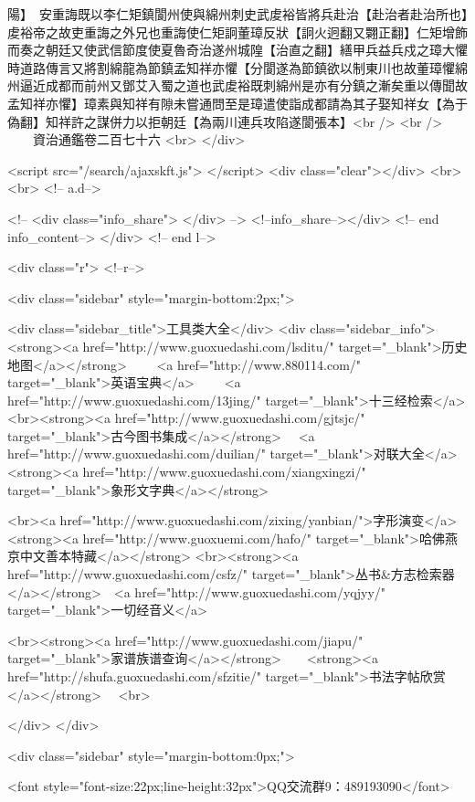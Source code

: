陽】　安重誨既以李仁矩鎮閬州使與綿州刺史武䖍裕皆將兵赴治【赴治者赴治所也】䖍裕帝之故吏重誨之外兄也重誨使仁矩詗董璋反狀【詗火迥翻又翾正翻】仁矩增飾而奏之朝廷又使武信節度使夏魯奇治遂州城隍【治直之翻】繕甲兵益兵戍之璋大懼時道路傳言又將割綿龍為節鎮孟知祥亦懼【分閬遂為節鎮欲以制東川也故董璋懼綿州逼近成都而前州又鄧艾入蜀之道也武䖍裕既刺綿州是亦有分鎮之漸矣重以傳聞故孟知祥亦懼】璋素與知祥有隙未嘗通問至是璋遣使詣成都請為其子娶知祥女【為于偽翻】知祥許之謀併力以拒朝廷【為兩川連兵攻陷遂閬張本】<br />
<br />
　　資治通鑑卷二百七十六  <br>
   </div> 

<script src="/search/ajaxskft.js"> </script>
 <div class="clear"></div>
<br>
<br>
 <!-- a.d-->

 <!--
<div class="info_share">
</div> 
-->
 <!--info_share--></div>   <!-- end info_content-->
  </div> <!-- end l-->

<div class="r">   <!--r-->



<div class="sidebar"  style="margin-bottom:2px;">

 
<div class="sidebar_title">工具类大全</div>
<div class="sidebar_info">
<strong><a href="http://www.guoxuedashi.com/lsditu/" target="_blank">历史地图</a></strong>　　
<a href="http://www.880114.com/" target="_blank">英语宝典</a>　　
<a href="http://www.guoxuedashi.com/13jing/" target="_blank">十三经检索</a>　
<br><strong><a href="http://www.guoxuedashi.com/gjtsjc/" target="_blank">古今图书集成</a></strong>　
<a href="http://www.guoxuedashi.com/duilian/" target="_blank">对联大全</a>　<strong><a href="http://www.guoxuedashi.com/xiangxingzi/" target="_blank">象形文字典</a></strong>　

<br><a href="http://www.guoxuedashi.com/zixing/yanbian/">字形演变</a>　　<strong><a href="http://www.guoxuemi.com/hafo/" target="_blank">哈佛燕京中文善本特藏</a></strong>
<br><strong><a href="http://www.guoxuedashi.com/csfz/" target="_blank">丛书&方志检索器</a></strong>　<a href="http://www.guoxuedashi.com/yqjyy/" target="_blank">一切经音义</a>　　

<br><strong><a href="http://www.guoxuedashi.com/jiapu/" target="_blank">家谱族谱查询</a></strong>　　<strong><a href="http://shufa.guoxuedashi.com/sfzitie/" target="_blank">书法字帖欣赏</a></strong>　
<br>

</div>
</div>


<div class="sidebar" style="margin-bottom:0px;">

<font style="font-size:22px;line-height:32px">QQ交流群9：489193090</font>


